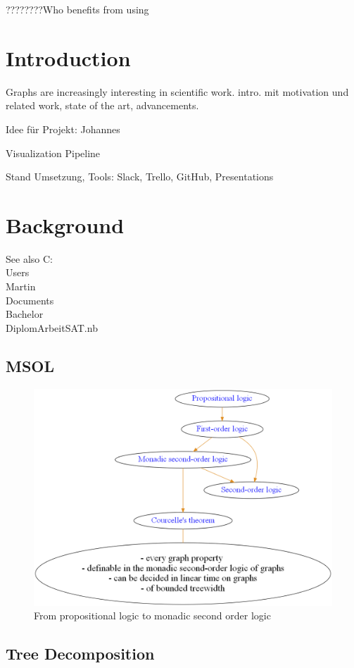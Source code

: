 \documentclass[a4paper, 12pt]{scrartcl}
\begin{document}
????????Who benefits from using

\newpage

\tableofcontents

\newpage


\section{Introduction}
Graphs are increasingly interesting in scientific work.
intro. mit motivation und related work, state of the art, advancements.

Idee für Projekt: Johannes 

Visualization Pipeline

Stand Umsetzung, Tools: Slack, Trello, GitHub, Presentations

\newpage
\section{Background}
See also C:\\Users\\Martin\\Documents\\Bachelor\\DiplomArbeitSAT.nb
\subsection{MSOL}
\begin{figure}[H]
	\centering
	\includegraphics[width=0.8\linewidth]{images/logictheory.png}
	\caption{From propositional logic to monadic second order logic}
	\label{fig:logictheory}
\end{figure}
\subsection{Tree Decomposition}
\end{document}
